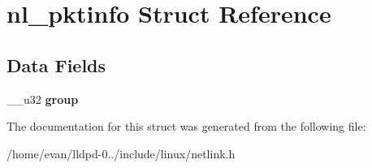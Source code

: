 \section{nl\-\_\-pktinfo \-Struct \-Reference}
\label{structnl__pktinfo}
\subsection*{\-Data \-Fields}
\begin{DoxyCompactItemize}
\item 
\-\_\-\-\_\-u32 {\bfseries group}\label{structnl__pktinfo_a78d77ee7dddb55903b0b6d1348faf32c}

\end{DoxyCompactItemize}


\-The documentation for this struct was generated from the following file\-:\begin{DoxyCompactItemize}
\item 
/home/evan/lldpd-\/0../include/linux/netlink.\-h\end{DoxyCompactItemize}
